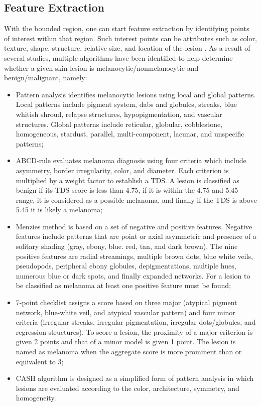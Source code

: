     \subsection{Feature Extraction}
    With the bounded region, one can start feature extraction by identifying points of interest within that region. Such interest points can be attributes such as color, texture, shape, structure, relative size, and location of the lesion \cite{Barata2014}. As a result of several studies, multiple algorithms have been identified to help determine whether a given skin lesion is melanocytic/nonmelanocytic and benign/malignant, namely: 
    \begin{itemize}
        \item Pattern analysis \cite{Pehamberger1987}\cite{Barzegari2005} identifies melanocytic lesions using local and global patterns. Local patterns include pigment system, dabs and globules, streaks, blue whitish shroud, relapse structures, hypopigmentation, and vascular structures. Global patterns include reticular, globular, cobblestone, homogeneous, stardust, parallel, multi-component, lacunar, and unspecific patterns;
        
        \item ABCD-rule \cite{Nachbar1994} evaluates melanoma diagnosis using four criteria which include asymmetry, border irregularity, color, and diameter. Each criterion is multiplied by a weight factor to establish a \ac{TDS}. A lesion is classified as benign if its \ac{TDS} score is less than 4.75, if it is within the 4.75 and 5.45 range, it is considered as a possible melanoma, and finally if the \ac{TDS} is above 5.45 it is likely a melanoma;
        
        \item Menzies method \cite{Johr2002} is based on a set of negative and positive features. Negative features include patterns that are point or axial asymmetric and presence of a solitary shading (gray, ebony, blue. red, tan, and dark brown). The nine positive features are radial streamings, multiple brown dots, blue white veils, pseudopods, peripheral ebony globules, depigmentations, multiple hues, numerous blue or dark spots, and finally expanded networks. For a lesion to be classified as melanoma at least one positive feature must be found;
        
        \item 7-point checklist \cite{Unlu2014}\cite{Walter2013} assigns a score based on three major (atypical pigment network, blue-white veil, and atypical vascular pattern) and four minor criteria (irregular streaks, irregular pigmentation, irregular dots/globules, and regression structures). To score a lesion, the proximity of a major criterion is given 2 points and that of a minor model is given 1 point. The lesion is named as melanoma when the aggregate score is more prominent than or equivalent to 3;
        
        \item CASH algorithm \cite{Henning2007} is designed as a simplified form of pattern analysis in which lesions are evaluated according to the color, architecture, symmetry, and homogeneity.
    \end{itemize}
    
